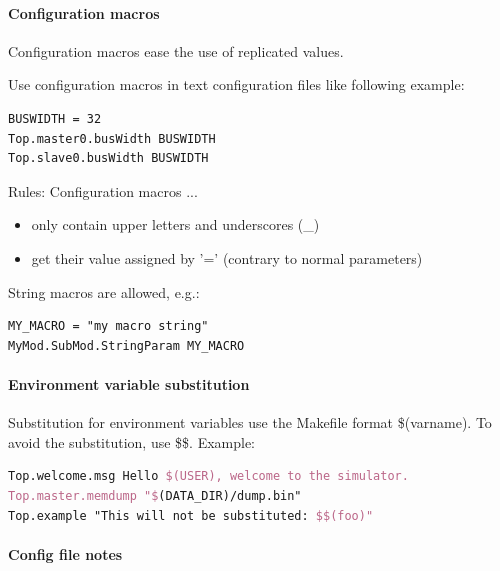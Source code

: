 \paragraph{Configuration macros}
Configuration macros ease the use of replicated values.

Use configuration macros in text configuration files like following example:
\begin{lstlisting}[language=TeX]
BUSWIDTH = 32
Top.master0.busWidth BUSWIDTH
Top.slave0.busWidth BUSWIDTH
\end{lstlisting}

Rules: Configuration macros ...
\begin{itemize}
  \item only contain upper letters and underscores (\_)
  \item get their value assigned by '=' (contrary to normal parameters)
\end{itemize}

String macros are allowed, e.g.:
\begin{lstlisting}[language=TeX]
MY_MACRO = "my macro string"
MyMod.SubMod.StringParam MY_MACRO
\end{lstlisting}

\paragraph{Environment variable substitution}

Substitution for environment variables use the Makefile format \$(varname). To avoid the substitution, use \$\$. Example:
\begin{lstlisting}[language=TeX]
Top.welcome.msg Hello $(USER), welcome to the simulator.
Top.master.memdump "$(DATA_DIR)/dump.bin"
Top.example "This will not be substituted: $$(foo)"
\end{lstlisting}


\paragraph{Config file notes}

